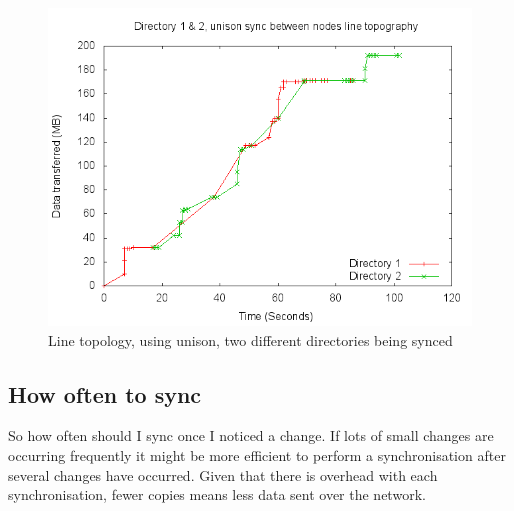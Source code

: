 \documentclass[12pt]{article}
\begin{document}
\begin{figure}[htp]
    \centering
    \includegraphics[scale=0.5]{images/line-uni-2dir-comb.png}
    \caption{Line topology, using unison, two different directories being synced}
    \label{fig:line_uni_2dir_comb_graph}
\end{figure}
\newpage

\subsection{How often to sync}
So how often should I sync once I noticed a change.
If lots of small changes are occurring frequently it might be more efficient
to perform a synchronisation after several changes have occurred. Given that
there is overhead with each synchronisation, fewer copies means less data
sent over the network.
\end{document}
